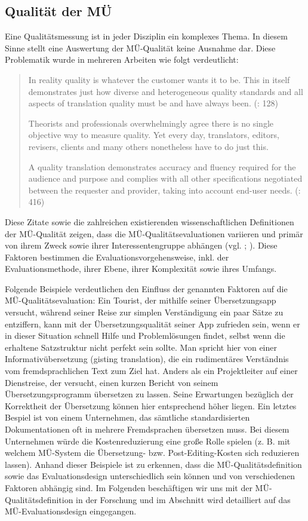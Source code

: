 \subsection{Qualität der MÜ}
\label{sec:3.3.1}
Eine Qualitätsmessung ist in jeder Disziplin ein komplexes Thema. In diesem Sinne stellt eine Auswertung der MÜ-Qualität keine Ausnahme dar. Diese Problematik wurde in mehreren Arbeiten wie folgt verdeutlicht:

\begin{quote}
In reality quality is whatever the customer wants it to be. This in itself demonstrates just how diverse and heterogeneous quality standards and all aspects of translation quality must be and have always been. (\citealt{BurchardtHarris2017}: 128)

Theorists and professionals overwhelmingly agree there is no single objective way to measure quality. Yet every day, translators, editors, revisers, clients and many others nonetheless have to do just this. \citep[35]{Drugan2013}

A quality translation demonstrates accuracy and fluency required for the audience and purpose and complies with all other specifications negotiated between the requester and provider, taking into account end-user needs. (\citealt{KobyEtAl2014}: 416)
\end{quote}

Diese Zitate sowie die zahlreichen existierenden wissenschaftlichen Definitionen der MÜ-Qualität zeigen, dass die MÜ-Qualitätsevaluationen variieren und primär von ihrem Zweck sowie ihrer Interessentengruppe abhängen (vgl. \citealt{Hutchins1997}; \citealt{White2003}). Diese Faktoren bestimmen die Evaluationsvorgehensweise, inkl. der Evaluationsmethode, ihrer Ebene, ihrer Komplexität sowie ihres Umfangs.

Folgende Beispiele verdeutlichen den Einfluss der genannten Faktoren auf die MÜ-Qualitätsevaluation: Ein Tourist, der mithilfe seiner Übersetzungsapp versucht, während seiner Reise zur simplen Verständigung ein paar Sätze zu entziffern, kann mit der Übersetzungsqualität seiner App zufrieden sein, wenn er in dieser Situation schnell Hilfe und Problemlösungen findet, selbst wenn die erhaltene Satzstruktur nicht perfekt sein sollte. Man spricht hier von einer Informativübersetzung (gisting translation), die ein rudimentäres Verständnis vom fremdsprachlichen Text zum Ziel hat. Anders als ein Projektleiter auf einer Dienstreise, der versucht, einen kurzen Bericht von seinem Übersetzungsprogramm übersetzen zu lassen. Seine Erwartungen bezüglich der Korrektheit der Übersetzung können hier entsprechend höher liegen. Ein letztes Bespiel ist von einem Unternehmen, das sämtliche standardisierten Dokumentationen oft in mehrere Fremdsprachen übersetzen muss. Bei diesem Unternehmen würde die Kostenreduzierung eine große Rolle spielen (z. B. mit welchem MÜ-System die Übersetzung- bzw. Post-Editing-Kosten sich reduzieren lassen). Anhand dieser Beispiele ist zu erkennen, dass die MÜ-Qualitätsdefinition sowie das Evaluationsdesign unterschiedlich sein können und von verschiedenen Faktoren abhängig sind. Im Folgenden beschäftigen wir uns mit der MÜ-Qualitätsdefinition in der Forschung und im Abschnitt  wird detailliert auf das MÜ-Evaluationsdesign eingegangen.

